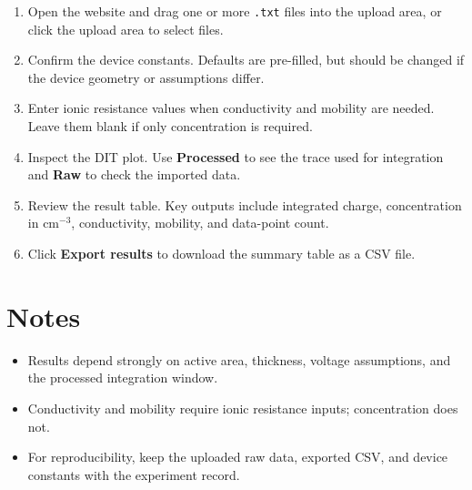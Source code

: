 \documentclass[10pt]{article}
\begin{document}
\begin{enumerate}
  \item Open the website and drag one or more \texttt{.txt} files into the upload area, or click the upload area to select files.
  \item Confirm the device constants. Defaults are pre-filled, but should be changed if the device geometry or assumptions differ.
  \item Enter ionic resistance values when conductivity and mobility are needed. Leave them blank if only concentration is required.
  \item Inspect the DIT plot. Use \textbf{Processed} to see the trace used for integration and \textbf{Raw} to check the imported data.
  \item Review the result table. Key outputs include integrated charge, concentration in \(\mathrm{cm^{-3}}\), conductivity, mobility, and data-point count.
  \item Click \textbf{Export results} to download the summary table as a CSV file.
\end{enumerate}

\section{Notes}

\begin{itemize}
  \item Results depend strongly on active area, thickness, voltage assumptions, and the processed integration window.
  \item Conductivity and mobility require ionic resistance inputs; concentration does not.
  \item For reproducibility, keep the uploaded raw data, exported CSV, and device constants with the experiment record.
\end{itemize}
\end{document}
